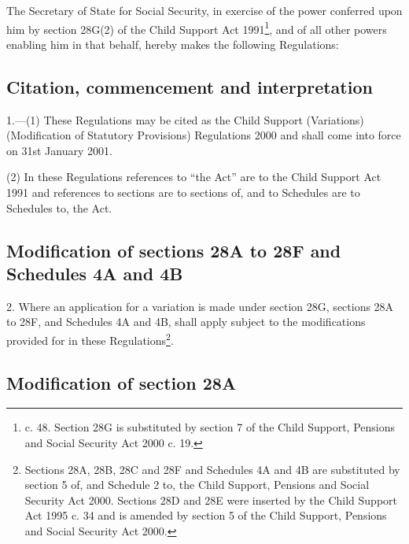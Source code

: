\documentclass[12pt,a4paper]{article}
\title{\regstitle}
\author{S.I. 2000 No. 3173}
\date{Made 29th November 2000\\Laid before Parliament 6th December 2000\\Coming into force 31st January 2001}
\begin{document}
\maketitle

\noindent
The Secretary of State for Social Security, in exercise of the power conferred upon him by section 28G(2) of the Child Support Act 1991\footnote{ c. 48. Section 28G is substituted by section 7 of the Child Support, Pensions and Social Security Act 2000 c. 19.}, and of all other powers enabling him in that behalf, hereby makes the following Regulations: 

{\sloppy

\tableofcontents

}

\bigskip

\setcounter{secnumdepth}{-2}

\subsection[1. Citation, commencement and interpretation]{Citation, commencement and interpretation}

1.---(1)  These Regulations may be cited as the Child Support (Variations) (Modification of Statutory Provisions) Regulations 2000 and shall come into force on 31st January 2001.

(2) In these Regulations references to “the Act” are to the Child Support Act 1991 and references to sections are to sections of, and to Schedules are to Schedules to, the Act.

\subsection[2. Modification of sections 28A to 28F and Schedules 4A and 4B]{Modification of sections 28A to 28F and Schedules 4A and 4B}

2.  Where an application for a variation is made under section 28G, sections 28A to 28F, and Schedules 4A and 4B, shall apply subject to the modifications provided for in these Regulations\footnote{\frenchspacing Sections 28A, 28B, 28C and 28F and Schedules 4A and 4B are substituted by section 5 of, and Schedule 2 to, the Child Support, Pensions and Social Security Act 2000. Sections 28D and 28E were inserted by the Child Support Act 1995 c. 34 and is amended by section 5 of the Child Support, Pensions and Social Security Act 2000.}.

\subsection[3. Modification of section 28A]{Modification of section 28A}
\end{document}
